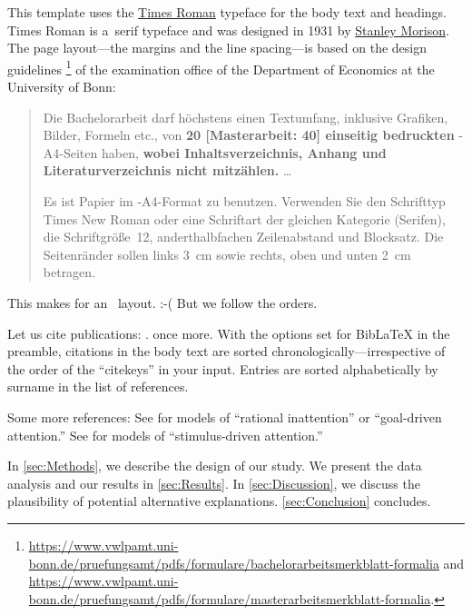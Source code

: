This template uses the \href{https://en.wikipedia.org/wiki/Times_New_Roman}{Times Roman} typeface for the body text and headings.%
Times Roman is a~serif type\-face and was designed in 1931 by \href{https://en.wikipedia.org/wiki/Stanley_Morison}{Stanley Morison}. The page layout---the margins and the line spacing---is based on the design guidelines%
\footnote{\url{https://www.vwlpamt.uni-bonn.de/pruefungsamt/pdfs/formulare/bachelorarbeitsmerkblatt-formalia} and \url{https://www.vwlpamt.uni-bonn.de/pruefungsamt/pdfs/formulare/masterarbeitsmerkblatt-formalia}.}
of the examination office of the Department of Economics at the University of Bonn:
\begin{quotation}
	Die Bachelorarbeit darf höchstens einen Textumfang, inklusive Grafiken, Bilder, Formeln etc., von \textbf{20 [Masterarbeit: 40] einseitig bedruckten} -A4-Seiten haben, \textbf{wobei Inhalts\-verzeichnis, Anhang und Literaturverzeichnis nicht mitzählen.} \dots
	
	Es ist Papier im -A4-Format zu benutzen. Verwenden Sie den Schrifttyp \mbox{Times} New Roman oder eine Schriftart der gleichen Kategorie (Serifen), die Schriftgröße~12, anderthalbfachen Zeilenabstand und Blocksatz. Die Seitenränder sollen links 3~cm sowie rechts, oben und unten 2~cm betragen.
\end{quotation}

This makes for an~ layout. :-( But we follow the orders. \blindtext

Let us cite  publications: \cite{Andersen2008, Andreoni2012, Balakrishnan2016, Koszegi2013}. \cite{Andersen2008} once more.%
With the options set for BibLaTeX in the preamble, citations in the body text are  sorted chronologically---irrespective of the order of the ``citekeys'' in your input. Entries are sorted alphabetically by surname in the list of references.

\Blindtext[2]

Some more references: See \cite{Sims2003, Gabaix2014} for models of ``rational inattention'' or ``goal-driven attention.'' See \cite{Bordalo2012, Bordalo2013, Koszegi2013, Taubinsky2014, Bushong2016} for models of ``stimulus-driven attention.''

\blindmathtrue

\blindtext

In \autoref{sec:Methods}, we describe the design of our study. We present the data analysis and our results in \autoref{sec:Results}. In \autoref{sec:Discussion}, we discuss the plausibility of potential alternative explanations. \autoref{sec:Conclusion} concludes.
